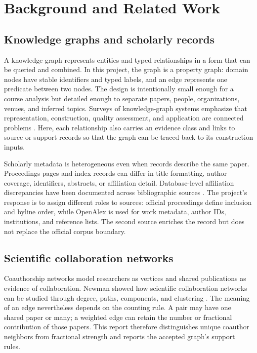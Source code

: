 \chapter{Background and Related Work}
\label{chap:background}

\section{Knowledge graphs and scholarly records}

A knowledge graph represents entities and typed relationships in a form that can
be queried and combined. In this project, the graph is a property graph: domain
nodes have stable identifiers and typed labels, and an edge represents one
predicate between two nodes. The design is intentionally small enough for a
course analysis but detailed enough to separate papers, people, organizations,
venues, and inferred topics. Surveys of knowledge-graph systems emphasize that
representation, construction, quality assessment, and application are connected
problems \citep{hogan2022knowledgegraphs}. Here, each relationship also carries
an evidence class and links to source or support records so that the graph can be
traced back to its construction inputs.

Scholarly metadata is heterogeneous even when records describe the same paper.
Proceedings pages and index records can differ in title formatting, author
coverage, identifiers, abstracts, or affiliation detail. Database-level
affiliation discrepancies have been documented across bibliographic sources
\citep{purnell2022affiliation}. The project's response is to assign different
roles to sources: official proceedings define inclusion and byline order, while
OpenAlex is used for work metadata, author IDs, institutions, and reference lists.
The second source enriches the record but does not replace the official corpus
boundary.

\section{Scientific collaboration networks}

Coauthorship networks model researchers as vertices and shared publications as
evidence of collaboration. Newman showed how scientific collaboration networks
can be studied through degree, paths, components, and clustering
\citep{newman2001collaboration}. The meaning of an edge nevertheless depends on
the counting rule. A pair may have one shared paper or many; a weighted edge can
retain the number or fractional contribution of those papers. This report
therefore distinguishes unique coauthor neighbors from fractional strength and
reports the accepted graph's support rules.

